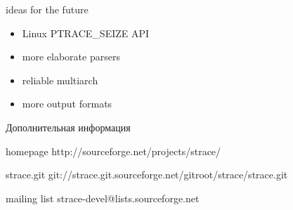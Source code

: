 \documentclass[unicode]{beamer}
\begin{document}
\begin{frame}{ideas for the future}
	\begin{itemize}
		\item Linux PTRACE\_SEIZE API
		\item more elaborate parsers
		\item reliable multiarch
		\item more output formats
	\end{itemize}
\end{frame}

\begin{frame}{Дополнительная информация}
\begin{block}{homepage}
	http://sourceforge.net/projects/strace/
\end{block}
\begin{block}{strace.git}
	git://strace.git.sourceforge.net/gitroot/strace/strace.git
\end{block}
\begin{block}{mailing list}
	strace-devel@lists.sourceforge.net
\end{block}
\end{frame}
\end{document}
